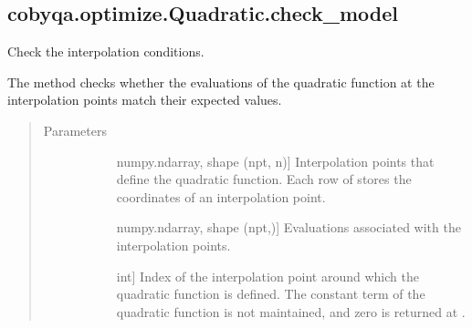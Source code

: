 \documentclass[letterpaper,10pt,english]{sphinxmanual}
\begin{document}
\begin{fulllineitems}
\begin{fulllineitems}
\begin{quote}
\begin{description}
\end{description}\end{quote}

\end{fulllineitems}



\subsection{cobyqa.optimize.Quadratic.check\_model}
\label{\detokenize{refs/generated/cobyqa.optimize.Quadratic.check_model:cobyqa-optimize-quadratic-check-model}}\label{\detokenize{refs/generated/cobyqa.optimize.Quadratic.check_model::doc}}

\begin{fulllineitems}
\label{\detokenize{refs/generated/cobyqa.optimize.Quadratic.check_model:cobyqa.optimize.Quadratic.check_model}}
\sphinxAtStartPar
Check the interpolation conditions.

\sphinxAtStartPar
The method checks whether the evaluations of the quadratic function at
the interpolation points match their expected values.
\begin{quote}\begin{description}
\item[{Parameters}] \leavevmode\begin{description}
\item[{}] \leavevmode{[}numpy.ndarray, shape (npt, n){]}
\sphinxAtStartPar
Interpolation points that define the quadratic function. Each row of
 stores the coordinates of an interpolation point.

\item[{}] \leavevmode{[}numpy.ndarray, shape (npt,){]}
\sphinxAtStartPar
Evaluations associated with the interpolation points.

\item[{}] \leavevmode{[}int{]}
\sphinxAtStartPar
Index of the interpolation point around which the quadratic function
is defined. The constant term of the quadratic function is not
maintained, and zero is returned at .


\end{description}
\end{description}
\end{quote}
\end{fulllineitems}
\end{fulllineitems}
\end{document}
